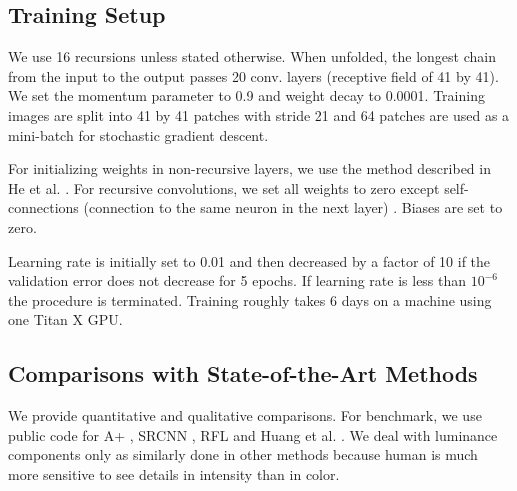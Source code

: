 \documentclass[10pt,twocolumn,letterpaper]{article}
\begin{document}
\subsection{Training Setup}
%
%
%
%
%
%

We use 16 recursions unless stated otherwise. When unfolded, the longest chain from the input to the output passes 20 conv. layers (receptive field of 41 by 41). We set the momentum parameter to 0.9 and weight decay to 0.0001. Training images are split into 41 by 41 patches with stride 21 and 64 patches are used as a mini-batch for stochastic gradient descent. 

For initializing weights in non-recursive layers, we use the method described in He et al. \cite{he2015delving}. For recursive convolutions, we set all weights to zero except self-connections (connection to the same neuron in the next layer) \cite{socher2012semantic, le2015simple}.  Biases are set to zero.

Learning rate is initially set to 0.01 and then decreased by a factor of 10 if the validation error does not decrease for 5 epochs. If learning rate is less than $10^{-6}$ the procedure is terminated. Training roughly takes 6 days on a machine using one Titan X GPU. 


\subsection{Comparisons with State-of-the-Art Methods}
We provide quantitative and qualitative comparisons. For benchmark, we use public code for A+ \cite{Timofte}, SRCNN \cite{dong2014image}, RFL \cite{schulter2015fast} and  Huang et al. \cite{Huang-CVPR-2015}. We deal with luminance components only as similarly done in other methods because human is much more sensitive to see details in intensity than in color. 
\end{document}
